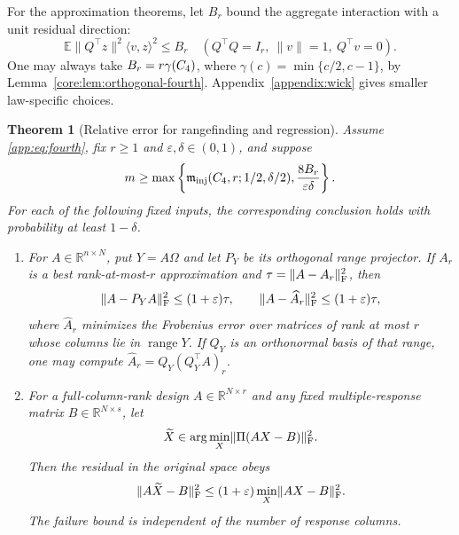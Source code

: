 \documentclass[11pt,a4paper]{article}
\newtheorem{theorem}{Theorem}[section]
\theoremstyle{definition}\newtheorem{definition}[theorem]{Definition}
\theoremstyle{remark}\newtheorem{remark}[theorem]{Remark}
\numberwithin{equation}{section}
\newcommand{\R}{\mathbb R}\newcommand{\E}{\mathbb E}\newcommand{\Pp}{\mathbb P}
\newcommand{\norm}[1]{\lVert#1\rVert}\newcommand{\ip}[2]{\langle#1,#2\rangle}
\DeclareMathOperator{\range}{range}\DeclareMathOperator{\diag}{diag}
\begin{document}
For the approximation theorems, let $B_r$ bound the aggregate
interaction with a unit residual direction:
\begin{equation}\label{app:eq:aggregate-budget}
 \E\norm{Q^\top z}^2\ip vz^2\le B_r
 \quad(Q^\top Q=I_r,\ \norm v=1,\ Q^\top v=0).
\end{equation}
One may always take $B_r=r\gamma({C_4})$, where
$\gamma(c)=\min\{c/2,c-1\}$, by Lemma~\ref{core:lem:orthogonal-fourth}.
Appendix~\ref{appendix:wick} gives smaller law-specific choices.

\begin{theorem}[Relative error for rangefinding and regression]
\label{app:thm:relative}
Assume \eqref{app:eq:fourth}, fix $r\ge1$ and $\varepsilon,\delta\in(0,1)$,
and suppose
\begin{equation}\label{app:eq:relative-budget}
 m\ge\max\left\{\mathfrak m_{\rm inj}({C_4},r;1/2,\delta/2),
                       \frac{8B_r}{\varepsilon\delta}\right\}.
\end{equation}
For each of the following fixed inputs, the corresponding conclusion holds
with probability at least $1-\delta$.
\begin{enumerate}
\item For $A\in\R^{n\times N}$, put $Y=A\Omega$ and let $P_Y$ be its
orthogonal range projector. If $A_r$ is a best rank-at-most-$r$
approximation and $\tau=\norm{A-A_r}_\F^2$, then
\begin{equation}\label{app:eq:rsvd-relative}
 \norm{A-P_YA}_\F^2\le(1+\varepsilon)\tau,
 \qquad
 \norm{A-\widehat A_r}_\F^2\le(1+\varepsilon)\tau,
\end{equation}
where $\widehat A_r$ minimizes the Frobenius error over matrices of rank at
most $r$ whose columns lie in $\range Y$. If $Q_Y$ is an orthonormal basis
of that range, one may compute $\widehat A_r=Q_Y(Q_Y^\top A)_r$.
\item For a full-column-rank design $A\in\R^{N\times r}$ and any fixed
multiple-response matrix $B\in\R^{N\times s}$, let
\[
 \widetilde X\in\arg\min_X\norm{\Pi(AX-B)}_\F^2.
\]
Then the residual in the original space obeys
\begin{equation}\label{app:eq:ls-relative}
 \norm{A\widetilde X-B}_\F^2
 \le(1+\varepsilon)\min_X\norm{AX-B}_\F^2.
\end{equation}
The failure bound is independent of the number of response columns.
\end{enumerate}
\end{theorem}
\end{document}
